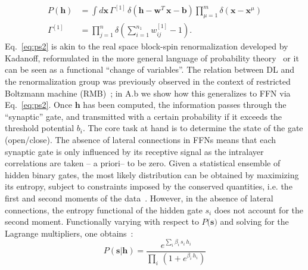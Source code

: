 \documentclass{article}
\begin{document}
%
\begin{align} \label{eq:ps2}
P(\mathbf{h}) &= \int {d\mathbf{x}} \, \Gamma^{[1]} \, \delta\left( \mathbf{h} -  \mathbf{w}^{T} \, \mathbf{x} - \mathbf{b} \right) \prod_{\mu =1}^m  \delta ( \mathbf{x} - \mathbf{x}^{\mu} ) \\ \nonumber
\Gamma^{[1]} &= \prod_{j=1}^n \delta\left( \sum_{i=1}^{n_1} w_{ij}^{[1]} -1 \right).
\end{align}
%
Eq.~\eqref{eq:ps2} is akin to the real space block-spin renormalization developed by Kadanoff, reformulated in the more general language of probability theory~\cite{roberto, ma, cassandro} or it can be seen as a functional ``change of variables''. The relation between  DL and the renormalization group was previously observed in the context of restricted Boltzmann machine (RMB)~\cite{mehta}; in A.b we show how this generalizes to FFN via Eq.~\eqref{eq:ps2}. Once $\mathbf{h}$ has been computed, the information passes through the ``synaptic'' gate, and transmitted with a certain probability if it exceeds the threshold potential $b_i$. The core task at hand is to determine the state of the gate (open/close). The absence of lateral connections in FFNs means that each synaptic gate is only influenced by its receptive signal as the intralayer correlations are taken -- a priori-- to be zero. Given a statistical ensemble of hidden binary gates, the most likely distribution  can be obtained by maximizing its entropy, subject to constraints imposed by the conserved quantities, i.e. the first and second moments of the data~\cite{zecchina, mckay}. However, in the absence of lateral connections, the entropy functional of the hidden gate $s_i$ does not account for the second moment.
%
%
Functionally varying with respect to $P(\mathbf{s)}$ and solving for the Lagrange multipliers, one  obtains~\cite{roberto}:
%
%
\begin{equation} \label{eq:entropy4}
P(\mathbf{s} | \mathbf{h}) = \frac{e^{ \sum_i \beta_i  \, s_i \, h_i }}{\prod_i \, \left( 1+ e^{\beta_i \, h_i} \right)} %
\end{equation}
%
\end{document}
